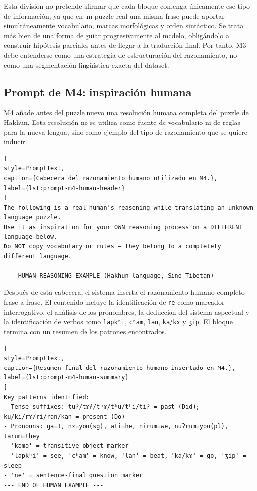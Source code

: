Esta división no pretende afirmar que cada bloque contenga únicamente ese tipo de información, ya que en un puzzle real una misma frase puede aportar simultáneamente vocabulario, marcas morfológicas y orden sintáctico. Se trata más bien de una forma de guiar progresivamente al modelo, obligándolo a construir hipótesis parciales antes de llegar a la traducción final. Por tanto, M3 debe entenderse como una estrategia de estructuración del razonamiento, no como una segmentación lingüística exacta del dataset.

\subsection{Prompt de M4: inspiración humana}
\label{subsec:prompt-m4}

M4 añade antes del puzzle nuevo una resolución humana completa del puzzle de Hakhun. Esta resolución no se utiliza como fuente de vocabulario ni de reglas para la nueva lengua, sino como ejemplo del tipo de razonamiento que se quiere inducir.

\begin{lstlisting}[
style=PromptText,
caption={Cabecera del razonamiento humano utilizado en M4.},
label={lst:prompt-m4-human-header}
]
The following is a real human's reasoning while translating an unknown language puzzle.
Use it as inspiration for your OWN reasoning process on a DIFFERENT language below.
Do NOT copy vocabulary or rules — they belong to a completely different language.

--- HUMAN REASONING EXAMPLE (Hakhun language, Sino-Tibetan) ---
\end{lstlisting}

Después de esta cabecera, el sistema inserta el razonamiento humano completo frase a frase. El contenido incluye la identificación de \texttt{ne} como marcador interrogativo, el análisis de los pronombres, la deducción del sistema aspectual y la identificación de verbos como \texttt{lapkʰi}, \texttt{cʰam}, \texttt{lan}, \texttt{ka/kɤ} y \texttt{ʒip}. El bloque termina con un resumen de los patrones encontrados.

\begin{lstlisting}[
style=PromptText,
caption={Resumen final del razonamiento humano insertado en M4.},
label={lst:prompt-m4-human-summary}
]
Key patterns identified:
- Tense suffixes: tuʔ/tɤʔ/tʰɤ/tʰu/tʰi/tiʔ = past (Did); ku/ki/rɤ/ri/ran/kan = present (Do)
- Pronouns: ŋa=I, nɤ=you(sg), ati=he, nirum=we, nuʔrum=you(pl), tarum=they
- 'kəmə' = transitive object marker
- 'lapkʰi' = see, 'cʰam' = know, 'lan' = beat, 'ka/kɤ' = go, 'ʒip' = sleep
- 'ne' = sentence-final question marker
--- END OF HUMAN EXAMPLE ---
\end{lstlisting}

